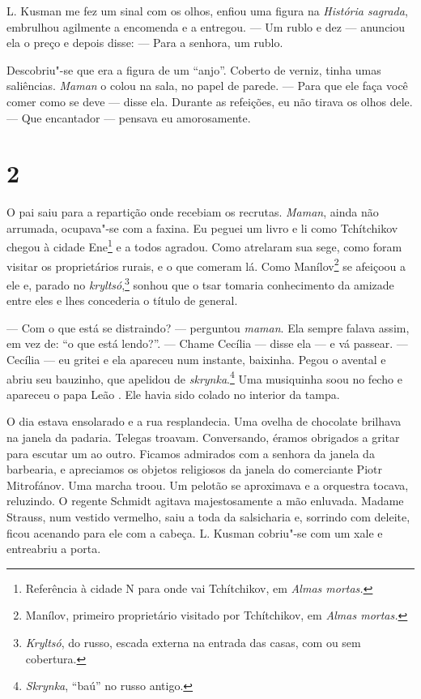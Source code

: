 L. Kusman me fez um sinal com os olhos, enfiou uma figura na
\emph{História sagrada}, embrulhou agilmente a encomenda e a entregou.
--- Um rublo e dez --- anunciou ela o preço e depois disse: --- Para a
senhora, um rublo.

Descobriu"-se que era a figura de um ``anjo''. Coberto de verniz, tinha
umas saliências. \emph{Maman} o colou na sala, no papel de parede. ---
Para que ele faça você comer como se deve --- disse ela. Durante as
refeições, eu não tirava os olhos dele. --- Que encantador --- pensava
eu amorosamente.

\section{2}

O pai saiu para a repartição onde recebiam os recrutas. \emph{Maman},
ainda não arrumada, ocupava"-se com a faxina. Eu peguei um livro e li
como Tchítchikov chegou à cidade Ene\footnote{Referência à cidade N para
  onde vai Tchítchikov, em \emph{Almas mortas.}} e a todos agradou.
Como atrelaram sua sege, como foram visitar os proprietários rurais, e o
que comeram lá. Como Manílov\footnote{Manílov, primeiro proprietário
  visitado por Tchítchikov, em \emph{Almas mortas. }} se afeiçoou a ele
e, parado no \emph{kryltsó},\footnote{\emph{Kryltsó}, do russo, escada
  externa na entrada das casas, com ou sem cobertura.} sonhou que o tsar
tomaria conhecimento da amizade entre eles e lhes concederia o título de
general.

--- Com o que está se distraindo? --- perguntou \emph{maman}. Ela sempre
falava assim, em vez de: ``o que está lendo?''. --- Chame Cecília ---
disse ela --- e vá passear. --- Cecília --- eu gritei e ela apareceu num
instante, baixinha. Pegou o avental e abriu seu bauzinho, que apelidou
de \emph{skrynka}.\footnote{\emph{Skrynka}, ``baú'' no russo antigo.}
Uma musiquinha soou no fecho e apareceu o papa Leão \scalebox{.8}{XIII}. Ele havia sido
colado no interior da tampa.

O dia estava ensolarado e a rua resplandecia. Uma ovelha de chocolate
brilhava na janela da padaria. Telegas troavam. Conversando, éramos
obrigados a gritar para escutar um ao outro. Ficamos admirados com a
senhora da janela da barbearia, e apreciamos os objetos religiosos da
janela do comerciante Piotr Mitrofánov. Uma marcha troou. Um pelotão se
aproximava e a orquestra tocava, reluzindo. O regente Schmidt agitava
majestosamente a mão enluvada. Madame Strauss, num vestido vermelho,
saiu a toda da salsicharia e, sorrindo com deleite, ficou acenando para
ele com a cabeça. L. Kusman cobriu"-se com um xale e entreabriu a porta.

